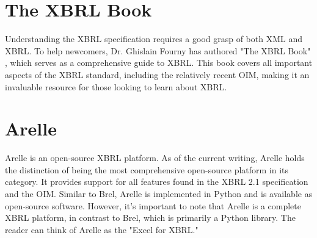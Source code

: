 
\section{The XBRL Book}
Understanding the XBRL specification requires a good grasp of both XML and XBRL.
To help newcomers, Dr. Ghislain Fourny has authored "The XBRL Book" \cite{fourny2023xbrl}, 
which serves as a comprehensive guide to XBRL. This book covers all important aspects of the XBRL standard, including the relatively recent OIM, 
making it an invaluable resource for those looking to learn about XBRL.

\section{Arelle}
Arelle\cite{arelle} is an open-source XBRL platform. 
As of the current writing, Arelle holds the distinction of being the most comprehensive open-source platform in its category. 
It provides support for all features found in the XBRL 2.1 specification and the OIM. 
Similar to Brel, Arelle is implemented in Python and is available as open-source software. 
However, it's important to note that Arelle is a complete XBRL platform, in contrast to Brel, which is primarily a Python library. 
The reader can think of Arelle as the "Excel for XBRL."


